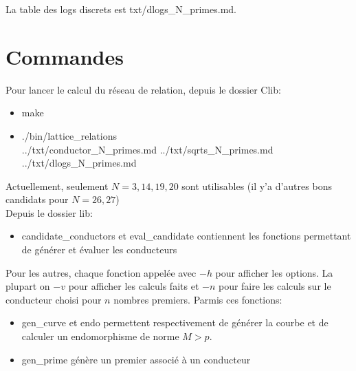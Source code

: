 \documentclass[12pt]{article}
\theoremstyle{plain}
\theoremstyle{definition}
\begin{document}
La table des logs discrets est txt/dlogs\_N\_primes.md.

\section{Commandes}
Pour lancer le calcul du réseau de relation, depuis 
le dossier Clib:
\begin{itemize}
    \item make
    \item ./bin/lattice\_relations\\ ../txt/conductor\_N\_primes.md ../txt/sqrts\_N\_primes.md ../txt/dlogs\_N\_primes.md
\end{itemize}

Actuellement, seulement $N=3, 14,19, 20$ sont utilisables (il y'a d'autres bons candidats pour $N=26,27$)\\


Depuis le dossier lib:
\begin{itemize}
    \item candidate\_conductors et
    eval\_candidate contiennent les fonctions
     permettant de générer et évaluer les conducteurs
\end{itemize}
Pour les autres, chaque fonction appelée avec $-h$ pour 
afficher les options. La plupart on $-v$ pour afficher 
les calculs faits et $-n$ pour faire les calculs sur 
le conducteur choisi pour $n$ nombres premiers. Parmis 
ces fonctions:
\begin{itemize}
    \item gen\_curve et endo permettent respectivement
    de générer la courbe et de calculer un endomorphisme
    de norme $M>p$.
    \item gen\_prime génère un premier associé à un conducteur 
\end{itemize}
\end{document}
